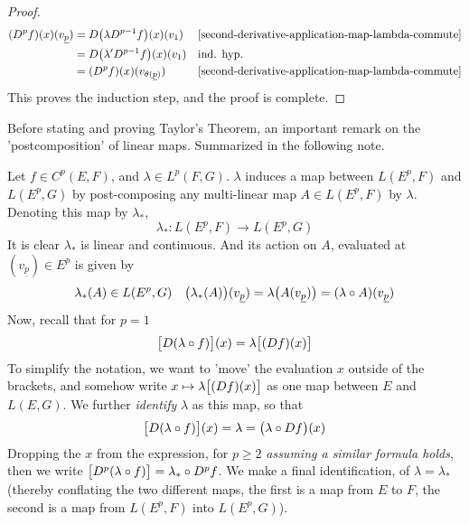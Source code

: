 \documentclass[../main-v2-manifolds.tex]{subfiles}
\begin{document}
\begin{proof}
    \begin{align*}
        (D^pf)(x)(v_{\underline{p}}) &= D\qty\big(\lambda D^{p-1}f)(x)(v_1)&&\text{\Cref{second-derivative-application-map-lambda-commute}}\\
        &= D\qty\big(\lambda' D^{p-1}f)(x)(v_1) &&\text{ind. hyp.}\\
        &= (D^pf)(x)(v_{\theta(\underline{p})})&&\text{\Cref{second-derivative-application-map-lambda-commute}}
    \end{align*}
    This proves the induction step, and the proof is complete.
\end{proof}
Before stating and proving Taylor's Theorem, an important remark on the 'postcomposition' of linear maps. Summarized in the following note. 

\begin{note}
    Let $f\in C^p(E,F)$, and $\lambda\in L^p(F,G)$. $\lambda$ induces a map between $L(E^p, F)$ and $L(E^p, G)$ by post-composing any multi-linear map $A\in L(E^p, F)$ by $\lambda$. Denoting this map by $\lambda_*$, 
\[
\lambda_*: L(E^p, F)\to L(E^p, G)
\]
It is clear $\lambda_*$ is linear and continuous. And its action on $A$, evaluated at $(v_{\underline{p}})\in E^p$ is given by
\[
    \lambda_*(A)\in L(E^p, G)\quad \qty\big(\lambda_*(A))(v_{\underline{p}}) = \lambda\qty\big(A(v_{\underline{p}})) = (\lambda\circ A)(v_{\underline{p}})
\]
Now, recall that for $p=1$
\[
    \qty\big[D(\lambda\circ f)](x) = \lambda\qty\big[(Df)(x)]
\]
To simplify the notation, we want to 'move' the evaluation $x$ outside of the brackets, and somehow write $x\mapsto \lambda\qty\big[(Df)(x)]$ as one map between $E$ and $L(E,G)$. We further \emph{identify} $\lambda$ as this map, so that
\[
    \qty\big[D(\lambda\circ f)](x) = \lambda  = \qty\big(\lambda \circ Df)(x)
\]
Dropping the $x$ from the expression, for $p\geq 2$ \emph{assuming a similar formula holds}, then we write $\qty\big[D^p(\lambda\circ f)] = \lambda_*\circ D^pf$. We make a final identification, of $\lambda = \lambda_*$ (thereby conflating the two different maps, the first is a map from $E$ to $F$, the second is a map from $L(E^p, F)$ into $L(E^p, G)$).
\end{note}
\end{document}
